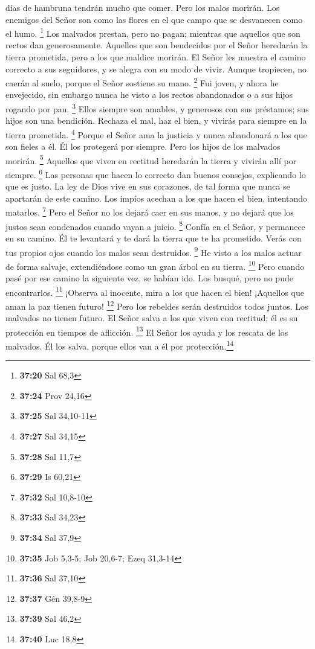 días de hambruna tendrán mucho que comer.  Pero los malos
morirán. Los enemigos del Señor son como las flores en el que campo que
se desvanecen como el humo. \footnote{\textbf{37:20} Sal 68,3}
 Los malvados prestan, pero no pagan; mientras que
aquellos que son rectos dan generosamente.  Aquellos que
son bendecidos por el Señor heredarán la tierra prometida, pero a los
que maldice morirán.  El Señor les muestra el camino
correcto a sus seguidores, y se alegra con su modo de vivir.
 Aunque tropiecen, no caerán al suelo, porque el Señor
sostiene su mano. \footnote{\textbf{37:24} Prov 24,16} 
Fui joven, y ahora he envejecido, sin embargo nunca he visto a los
rectos abandonados o a sus hijos rogando por pan. \footnote{\textbf{37:25}
  Sal 34,10-11}  Ellos siempre son amables, y generosos
con sus préstamos; sus hijos son una bendición.  Rechaza
el mal, haz el bien, y vivirás para siempre en la tierra prometida.
\footnote{\textbf{37:27} Sal 34,15}  Porque el Señor ama
la justicia y nunca abandonará a los que son fieles a él. Él los
protegerá por siempre. Pero los hijos de los malvados morirán.
\footnote{\textbf{37:28} Sal 11,7}  Aquellos que viven en
rectitud heredarán la tierra y vivirán allí por siempre. \footnote{\textbf{37:29}
  Is 60,21}  Las personas que hacen lo correcto dan
buenos consejos, explicando lo que es justo.  La ley de
Dios vive en sus corazones, de tal forma que nunca se apartarán de este
camino.  Los impíos acechan a los que hacen el bien,
intentando matarlos. \footnote{\textbf{37:32} Sal 10,8-10}
 Pero el Señor no los dejará caer en sus manos, y no
dejará que los justos sean condenados cuando vayan a juicio. \footnote{\textbf{37:33}
  Sal 34,23}  Confía en el Señor, y permanece en su
camino. Él te levantará y te dará la tierra que te ha prometido. Verás
con tus propios ojos cuando los malos sean destruidos. \footnote{\textbf{37:34}
  Sal 37,9}  He visto a los malos actuar de forma
salvaje, extendiéndose como un gran árbol en su tierra. \footnote{\textbf{37:35}
  Job 5,3-5; Job 20,6-7; Ezeq 31,3-14}  Pero cuando pasé
por ese camino la siguiente vez, se habían ido. Los busqué, pero no pude
encontrarlos. \footnote{\textbf{37:36} Sal 37,10} 
¡Observa al inocente, mira a los que hacen el bien! ¡Aquellos que aman
la paz tienen futuro! \footnote{\textbf{37:37} Gén 39,8-9}
 Pero los rebeldes serán destruidos todos juntos. Los
malvados no tienen futuro.  El Señor salva a los que
viven con rectitud; él es su protección en tiempos de aflicción.
\footnote{\textbf{37:39} Sal 46,2}  El Señor los ayuda y
los rescata de los malvados. Él los salva, porque ellos van a él por
protección.\footnote{\textbf{37:40} Luc 18,8}

